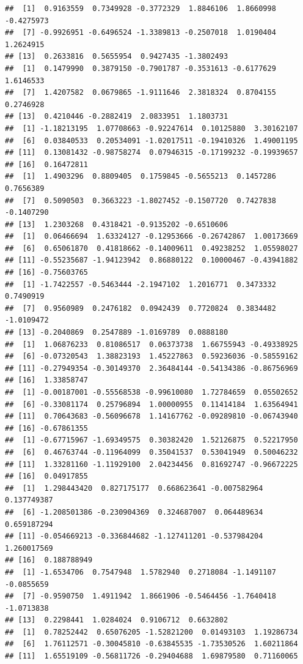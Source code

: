\documentclass[]{book}
\begin{document}
\begin{verbatim}
##  [1]  0.9163559  0.7349928 -0.3772329  1.8846106  1.8660998 -0.4275973
##  [7] -0.9926951 -0.6496524 -1.3389813 -0.2507018  1.0190404  1.2624915
## [13]  0.2633816  0.5655954  0.9427435 -1.3802493
##  [1]  0.1479990  0.3879150 -0.7901787 -0.3531613 -0.6177629  1.6146533
##  [7]  1.4207582  0.0679865 -1.9111646  2.3818324  0.8704155  0.2746928
## [13]  0.4210446 -0.2882419  2.0833951  1.1803731
##  [1] -1.18213195  1.07708663 -0.92247614  0.10125880  3.30162107
##  [6]  0.03840533  0.20534091 -1.02017511 -0.19410326  1.49001195
## [11]  0.13081432 -0.98758274  0.07946315 -0.17199232 -0.19939657
## [16]  0.16472811
##  [1]  1.4903296  0.8809405  0.1759845 -0.5655213  0.1457286  0.7656389
##  [7]  0.5090503  0.3663223 -1.8027452 -0.1507720  0.7427838 -0.1407290
## [13]  1.2303268  0.4318421 -0.9135202 -0.6510606
##  [1]  0.06466694  1.63324127 -0.12953666 -0.26742867  1.00173669
##  [6]  0.65061870  0.41818662 -0.14009611  0.49238252  1.05598027
## [11] -0.55235687 -1.94123942  0.86880122  0.10000467 -0.43941882
## [16] -0.75603765
##  [1] -1.7422557 -0.5463444 -2.1947102  1.2016771  0.3473332  0.7490919
##  [7]  0.9560989  0.2476182  0.0942439  0.7720824  0.3834482 -1.0109472
## [13] -0.2040869  0.2547889 -1.0169789  0.0888180
##  [1]  1.06876233  0.81086517  0.06373738  1.66755943 -0.49338925
##  [6] -0.07320543  1.38823193  1.45227863  0.59236036 -0.58559162
## [11] -0.27949354 -0.30149370  2.36484144 -0.54134386 -0.86756969
## [16]  1.33858747
##  [1] -0.00187001 -0.55568538 -0.99610080  1.72784659  0.05502652
##  [6] -0.33081174  0.25796894  1.00000955  0.11414184  1.63564941
## [11]  0.70643683 -0.56096678  1.14167762 -0.09289810 -0.06743940
## [16] -0.67861355
##  [1] -0.67715967 -1.69349575  0.30382420  1.52126875  0.52217950
##  [6]  0.46763744 -0.11964099  0.35041537  0.53041949  0.50046232
## [11]  1.33281160 -1.11929100  2.04234456  0.81692747 -0.96672225
## [16]  0.04917855
##  [1]  1.298443420  0.827175177  0.668623641 -0.007582964  0.137749387
##  [6] -1.208501386 -0.230904369  0.324687007  0.064489634  0.659187294
## [11] -0.054669213 -0.336844682 -1.127411201 -0.537984204  1.260017569
## [16]  0.188788949
##  [1] -1.6534706  0.7547948  1.5782940  0.2718084 -1.1491107 -0.0855659
##  [7] -0.9590750  1.4911942  1.8661906 -0.5464456 -1.7640418 -1.0713838
## [13]  0.2298441  1.0284024  0.9106712  0.6632802
##  [1]  0.78252442  0.65076205 -1.52821200  0.01493103  1.19286734
##  [6]  1.76112571 -0.30045810 -0.63845535 -1.73530526  1.60211864
## [11]  1.65519109 -0.56811726 -0.29404688  1.69879580  0.71160065

\end{verbatim}
\end{document}

